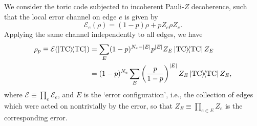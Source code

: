 We consider the toric code subjected to incoherent Pauli-$Z$ decoherence, such that the local error channel on edge $e$ is given by 
\begin{equation}
    \mathcal{E}_e(\rho) = (1-p) \rho + p Z_e \rho Z_e.
\end{equation}
Applying the same channel independently to all edges, we have 
\begin{equation}
    \begin{split}
        \rho_p \equiv \mathcal{E}(\dyad{\TC}) &= \sum_E (1-p)^{N_e - \abs{E}} p^{\abs{E}} Z_E \dyad{\TC} Z_E \\
        &= (1-p)^{N_e} \sum_E \term{\frac{p}{1-p}}^{\abs{E}}  Z_E \dyad{\TC} Z_E,
    \end{split}
\end{equation}
where $\mathcal{E} \equiv \prod_e \mathcal{E}_e$, and $E$ is the `error configuration', i.e., the collection of edges which were acted on nontrivially by the error, so that $Z_E \equiv \prod_{e\in E} Z_e$ is the corresponding error. 


